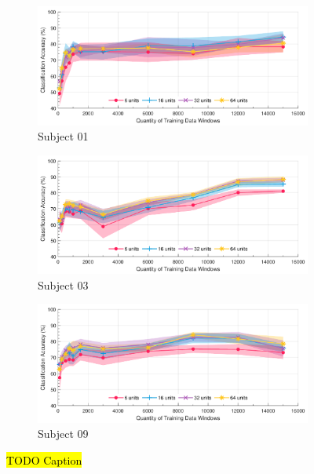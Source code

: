 \begin{figure}[p]
    \centering
    \begin{subfigure}[b]{0.9\textwidth}
        \centering
        \includegraphics[width=\textwidth]{content/5-Personalisation/Bespoke_Target/ch5_bespoke_target_model_subject_1.pdf}
        \caption{Subject 01}
        \label{fig:ch5_6_unit_bespoke_model}
    \end{subfigure}
    \begin{subfigure}[b]{0.9\textwidth}
        \centering
        \includegraphics[width=\textwidth]{content/5-Personalisation/Bespoke_Target/ch5_bespoke_target_model_subject_3.pdf}
        \caption{Subject 03}
        \label{fig:ch5_16_unit_bespoke_model}
    \end{subfigure}
    \begin{subfigure}[b]{0.9\textwidth}
        \centering
        \includegraphics[width=\textwidth]{content/5-Personalisation/Bespoke_Target/ch5_bespoke_target_model_subject_9.pdf}
        \caption{Subject 09}
        \label{fig:ch5_32_unit_bespoke_model}
    \end{subfigure}
    \caption[TODO Caption]{\hl{TODO Caption}}
    \label{fig:ch5_bespoke_mode_classification}
\end{figure}

